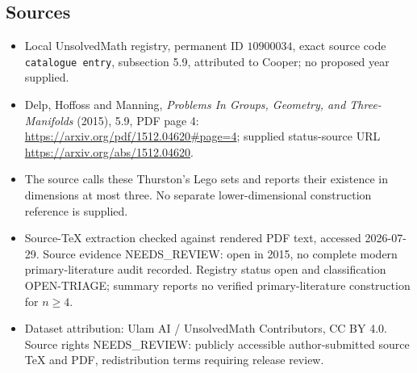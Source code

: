 \documentclass[11pt]{article}
\begin{document}
\subsection{Sources}
\begin{itemize}
\item Local UnsolvedMath registry, permanent ID \(10900034\), exact source code \texttt{catalogue entry}, subsection 5.9, attributed to Cooper; no proposed year supplied.
\item Delp, Hoffoss and Manning, \emph{Problems In Groups, Geometry, and Three-Manifolds} (2015), 5.9, PDF page 4: \url{https://arxiv.org/pdf/1512.04620#page=4}; supplied status-source URL \url{https://arxiv.org/abs/1512.04620}.
\item The source calls these Thurston's Lego sets and reports their existence in dimensions at most three. No separate lower-dimensional construction reference is supplied.
\item Source-TeX extraction checked against rendered PDF text, accessed 2026-07-29. Source evidence NEEDS\_REVIEW: open in 2015, no complete modern primary-literature audit recorded. Registry status open and classification OPEN-TRIAGE; summary reports no verified primary-literature construction for \(n\ge4\).
\item Dataset attribution: Ulam AI / UnsolvedMath Contributors, CC BY 4.0. Source rights NEEDS\_REVIEW: publicly accessible author-submitted source TeX and PDF, redistribution terms requiring release review.
\end{itemize}
\end{document}
